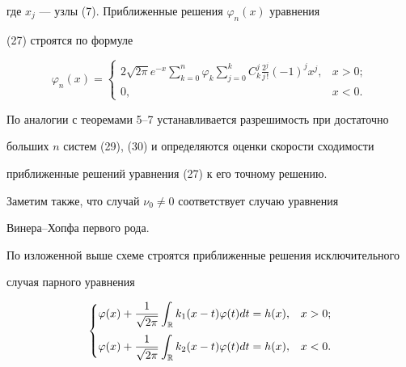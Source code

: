 где $x_j$ --- узлы (7). Приближенные решения $\varphi_n(x)$ уравнения 


(27) строятся по формуле 


$$ 


\varphi_n(x)= 


\begin{cases} 


\displaystyle 2\sqrt{2\pi}e^{-x}\sum^n_{k=0}\varphi_k 


\sum^k_{j=0}C^j_k\frac{2^j}{j\,!}(-1)^j x^j, & x>0;\\[2mm] 


0, & x<0. 


\end{cases} 


$$ 


 


По аналогии с теоремами 5--7 устанавливается разрешимость при достаточно 


больших $n$ систем (29), (30) и определяются оценки скорости сходимости 


приближенные решений уравнения (27) к его точному решению. 


 


Заметим также, что случай $\nu_0\ne 0$ соответствует случаю уравнения 


Винера--Хопфа первого рода. 


 


По изложенной выше схеме строятся приближенные решения исключительного 


случая парного уравнения 


$$ 


\begin{cases} 


\displaystyle \varphi(x)+\frac{1}{\sqrt{2\pi}}\int_{\Bbb R} 


k_1(x-t)\varphi(t)dt=h(x), &x>0;\\[4mm] 


\displaystyle \varphi(x)+\frac{1}{\sqrt{2\pi}}\int_{\Bbb R} 


k_2(x-t)\varphi(t)dt=h(x), &x<0. 


\end{cases} 


$$ 


 


